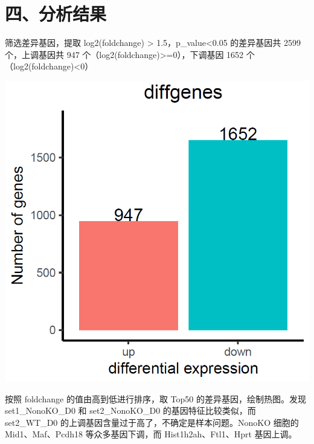 \documentclass[
  a4paper,
]{article}
\begin{document}
\hypertarget{ux56dbux5206ux6790ux7ed3ux679c}{%
\section{四、分析结果}\label{ux56dbux5206ux6790ux7ed3ux679c}}

筛选差异基因，提取 \textbar{} log2(foldchange) \textbar{} \textgreater{}
1.5，p\_value\textless0.05 的差异基因共 2599 个，上调基因共 947
个（log2(foldchange)\textgreater=0），下调基因 1652
个（log2(foldchange)\textless0）

\includegraphics{assets/Snipaste_2022-10-26_09-45-07-20221026094508-gu7vli7.png}\hspace{0pt}

按照 foldchange 的值由高到低进行排序，取 Top50
的差异基因，绘制热图。发现 set1\_NonoKO\_D0 和 set2\_NonoKO\_D0
的基因特征比较类似，而 set2\_WT\_D0
的上调基因含量过于高了，不确定是样本问题。NonoKO 细胞的
Mid1、Maf、Pcdh18 等众多基因下调，而 Hist1h2ah、Ftl1、Hprt 基因上调。
\end{document}
